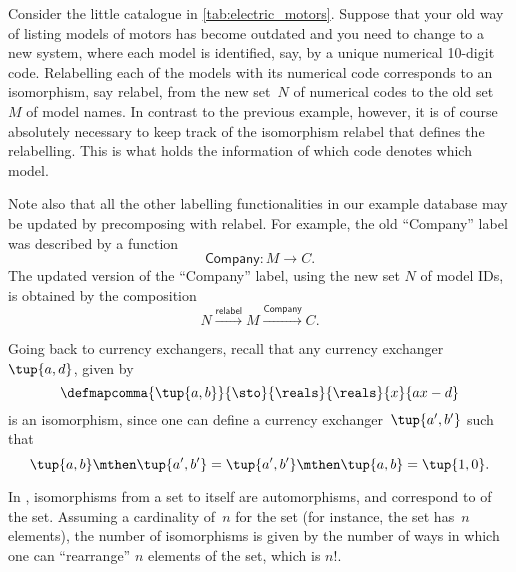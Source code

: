 \begin{example}[Relabelling]
	Consider the little catalogue in \cref{tab:electric_motors}.
	Suppose that your old way of listing models of motors has become outdated and you need to change to a new system, where each model is identified, say, by a unique numerical 10-digit code.
	Relabelling each of the models with its numerical code corresponds to an isomorphism, say \textsf{relabel}, from the new set~$N$ of numerical codes to the old set~$M$ of model names.
	In contrast to the previous example, however, it is of course absolutely necessary to keep track of the isomorphism \textsf{relabel} that defines the relabelling.
	This is what holds the information of which code denotes which model.

	Note also that all the other labelling functionalities in our example database may be updated by precomposing with \textsf{relabel}.
	For example, the old ``Company'' label was described by a function
	\begin{equation*}
		\textsf{Company}\colon M \to C.
	\end{equation*}
	The updated version of the ``Company'' label, using the new set $N$ of model IDs, is obtained by the composition
	\begin{equation*}
		N \overset{\textsf{relabel}}{\longrightarrow} M \overset{\textsf{Company}}{\longrightarrow} C.
	\end{equation*}
\end{example}

\begin{example}
	Going back to currency exchangers, recall that any currency exchanger~$\tup{a,d}$, given by
	\begin{equation*}
		\defmapcomma{\tup{a,b}}{\sto}{\reals}{\reals}{x}{ax-d}
	\end{equation*}
	is an isomorphism, since one can define a currency exchanger~$\tup{a',b'}$ such that
	\begin{equation*}
		\tup{a,b}\mthen \tup{a',b'}=\tup{a',b'}\mthen \tup{a,b}=\tup{1,0}.
	\end{equation*}
\end{example}

\begin{example}
	In \FinSet, isomorphisms from a set to itself are automorphisms, and correspond to \emph{} of the set.
	Assuming a cardinality of~$n$ for the set (for instance, the set has~$n$ elements), the number of isomorphisms is given by the number of ways in which one can ``rearrange'' $n$ elements of the set, which is $n!
	$.
\end{example}

